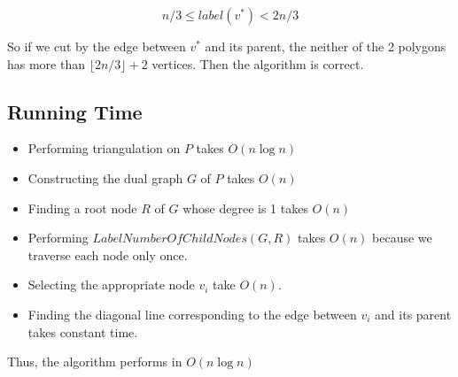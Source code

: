 $$n/3 \leq label(v^*) < 2n/3$$

So if we cut by the edge between $v^*$ and its parent, the neither of the 2 polygons has more than $\lfloor2n/3\rfloor + 2$ vertices.
Then the algorithm is correct. \\


\subsection*{Running Time}
\begin{itemize}
    \item Performing triangulation on $P$ takes $O(n\log{n})$
    \item Constructing the dual graph $G$ of $P$ takes $O(n)$
    \item Finding a root node $R$ of $G$ whose degree is 1 takes $O(n)$
    \item Performing $LabelNumberOfChildNodes(G,R)$ takes $O(n)$ because we traverse each node only once.
    \item Selecting the appropriate node $v_i$ take $O(n)$.
    \item Finding the diagonal line corresponding to the edge between $v_i$ and its parent takes constant time.
\end{itemize}

Thus, the algorithm performs in $O(n\log{n})$
